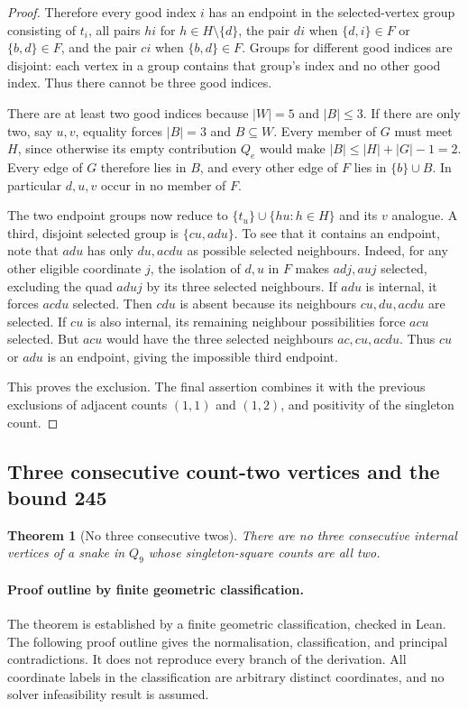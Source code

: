 \documentclass[11pt,a4paper]{article}
\newtheorem{theorem}{Theorem}[section]
\theoremstyle{definition}
\theoremstyle{remark}
\newcommand{\Q}{Q}
\begin{document}
\begin{proof}
Therefore every good index $i$ has an endpoint in the selected-vertex group consisting of $t_i$, all pairs $hi$ for $h\in H\setminus\{d\}$, the pair $di$ when $\{d,i\}\in F$ or $\{b,d\}\in F$, and the pair $ci$ when $\{b,d\}\in F$. Groups for different good indices are disjoint: each vertex in a group contains that group's index and no other good index. Thus there cannot be three good indices.

There are at least two good indices because $|W|=5$ and $|B|\le3$. If there are only two, say $u,v$, equality forces $|B|=3$ and $B\subseteq W$. Every member of $G$ must meet $H$, since otherwise its empty contribution $Q_e$ would make $|B|\le|H|+|G|-1=2$. Every edge of $G$ therefore lies in $B$, and every other edge of $F$ lies in $\{b\}\cup B$. In particular $d,u,v$ occur in no member of $F$.

The two endpoint groups now reduce to $\{t_u\}\cup\{hu:h\in H\}$ and its $v$ analogue. A third, disjoint selected group is $\{cu,adu\}$. To see that it contains an endpoint, note that $adu$ has only $du,acdu$ as possible selected neighbours. Indeed, for any other eligible coordinate $j$, the isolation of $d,u$ in $F$ makes $adj,auj$ selected, excluding the quad $aduj$ by its three selected neighbours. If $adu$ is internal, it forces $acdu$ selected. Then $cdu$ is absent because its neighbours $cu,du,acdu$ are selected. If $cu$ is also internal, its remaining neighbour possibilities force $acu$ selected. But $acu$ would have the three selected neighbours $ac,cu,acdu$. Thus $cu$ or $adu$ is an endpoint, giving the impossible third endpoint.

This proves the exclusion. The final assertion combines it with the previous exclusions of adjacent counts $(1,1)$ and $(1,2)$, and positivity of the singleton count.
\end{proof}


\subsection{Three consecutive count-two vertices and the bound 245}

\begin{theorem}[No three consecutive twos]\label{thm:no-three-twos}
There are no three consecutive internal vertices of a snake in $\Q_9$ whose singleton-square counts are all two.
\end{theorem}

\paragraph{Proof outline by finite geometric classification.}
The theorem is established by a finite geometric classification, checked in Lean. The following proof outline gives the normalisation, classification, and principal contradictions. It does not reproduce every branch of the derivation. All coordinate labels in the classification are arbitrary distinct coordinates, and no solver infeasibility result is assumed.
\end{document}
